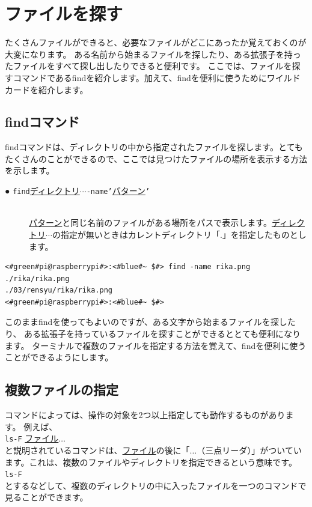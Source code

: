 \documentclass[text03.tex]{subfiles}
\begin{document}
\newpage
\section{ファイルを探す}
たくさんファイルができると、必要なファイルがどこにあったか覚えておくのが大変になります。
ある名前から始まるファイルを探したり、ある拡張子を持ったファイルをすべて探し出したりできると便利です。
ここでは、ファイルを探すコマンドであるfindを紹介します。加えて、findを便利に使うためにワイルドカードを紹介します。

\subsection{findコマンド}
findコマンドは、ディレクトリの中から指定されたファイルを探します。とてもたくさんのことができるので、ここでは見つけたファイルの場所を表示する方法を示します。

\begin{description}
    \item[● \texttt{find}\textvisiblespace \underline{ディレクトリ}$\cdots$\textvisiblespace \texttt{-name}\textvisiblespace \texttt{'}\underline{パターン}\texttt{'} ]\mbox{}\\ 
    \underline{パターン}と同じ名前のファイルがある場所をパスで表示します。\underline{ディレクトリ}$\cdots$の指定が無いときはカレントディレクトリ「.」を指定したものとします。
\end{description}

\begin{lstlisting}[caption=ワイルドカードの使い方, label=wildcard]
<#green#pi@raspberrypi#>:<#blue#~ $#> find -name rika.png
./rika/rika.png
./03/rensyu/rika/rika.png
<#green#pi@raspberrypi#>:<#blue#~ $#>
\end{lstlisting}

このままfindを使ってもよいのですが、ある文字から始まるファイルを探したり、
ある拡張子を持っているファイルを探すことができるととても便利になります。
ターミナルで複数のファイルを指定する方法を覚えて、findを便利に使うことができるようにします。

\subsection{複数ファイルの指定}
コマンドによっては、操作の対象を2つ以上指定しても動作するものがあります。
例えば、\\
\texttt{ls}\textvisiblespace \texttt{-F} \underline{ファイル}$\ldots$\\
と説明されているコマンドは、\underline{ファイル}の後に「$\ldots$（三点リーダ）」がついています。これは、複数のファイルやディレクトリを指定できるという意味です。\\
\texttt{ls}\textvisiblespace \texttt{-F} \\
とするなどして、複数のディレクトリの中に入ったファイルを一つのコマンドで見ることができます。
\end{document}
